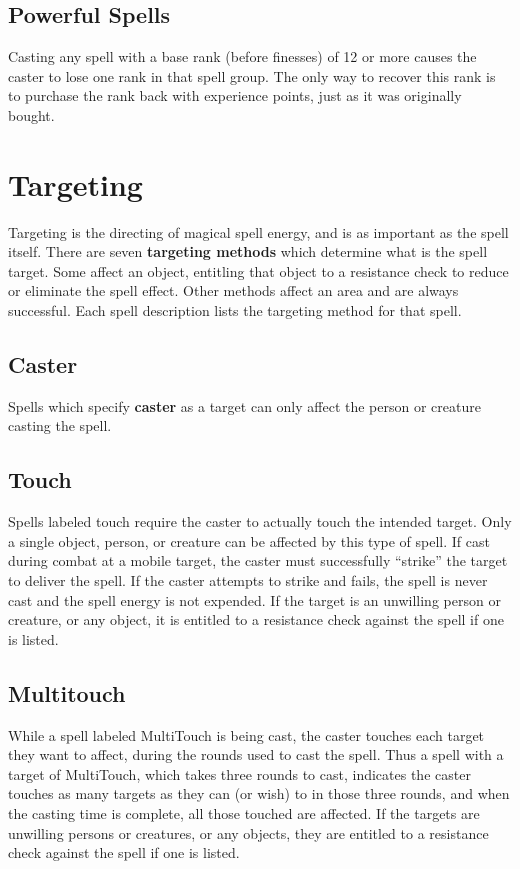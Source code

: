\begin{multicols*}{2}
\subsection{Powerful Spells}
Casting any spell with a base rank (before finesses) of 12 or more causes the caster to lose one rank in that spell group. The only way to recover this rank is to purchase the rank back with experience points, just as it was originally bought.
\section{Targeting}
Targeting is the directing of magical spell energy, and is as important as the spell itself. There are seven \textbf{targeting methods} which determine what is the spell target. Some affect an object, entitling that object to a resistance check to reduce or eliminate the spell effect. Other methods affect an area and are always successful. Each spell description lists the targeting method for that spell.
\subsection{Caster}

Spells which specify \textbf{caster} as a target can only
affect the person or creature casting the spell.
\subsection{Touch}

Spells labeled touch require the caster to actually touch the intended target. Only a single object, person, or creature can be affected by this type of spell. If cast during combat at a mobile target, the caster must successfully “strike” the target to deliver the spell. If the caster attempts to strike and fails, the spell is never cast and the spell energy is not expended. If the target is an unwilling person or creature,
or any object, it is entitled to a resistance check against the spell if one is listed.
\subsection{Multitouch}

While a spell labeled MultiTouch is being cast, the
caster touches each target they want to affect, during the rounds used to cast the spell. Thus a spell with a target of MultiTouch, which takes three rounds to cast, indicates the caster touches as many targets as they can (or wish) to in those three rounds, and when the casting time is complete, all those touched are affected. If the targets are unwilling persons or creatures, or any objects, they are entitled to a resistance check against the spell if one is listed.

\end{multicols*}
